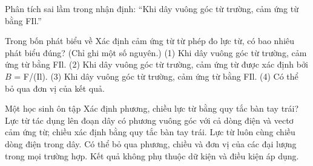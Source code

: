 \begin{bt}
Phân tích sai lầm trong nhận định: “Khi dây vuông góc từ trường, cảm ứng từ bằng FIl.”
\end{bt}

\begin{ex}
Trong bốn phát biểu về Xác định cảm ứng từ từ phép đo lực từ, có bao nhiêu phát biểu đúng? (Chỉ ghi một số nguyên.) (1) Khi dây vuông góc từ trường, cảm ứng từ bằng FIl. (2) Khi dây vuông góc từ trường, cảm ứng từ được xác định bởi $B$ = F/(Il). (3) Khi dây vuông góc từ trường, cảm ứng từ bằng FIl. (4) Có thể bỏ qua đơn vị của kết quả.
\end{ex}

\begin{ex}
Một học sinh ôn tập Xác định phương, chiều lực từ bằng quy tắc bàn tay trái?
\choice
{\True Lực từ tác dụng lên đoạn dây có phương vuông góc với cả dòng điện và vectơ cảm ứng từ; chiều xác định bằng quy tắc bàn tay trái.}
{Lực từ luôn cùng chiều dòng điện trong dây.}
{Có thể bỏ qua phương, chiều và đơn vị của các đại lượng trong mọi trường hợp.}
{Kết quả không phụ thuộc dữ kiện và điều kiện áp dụng.}
\end{ex}

